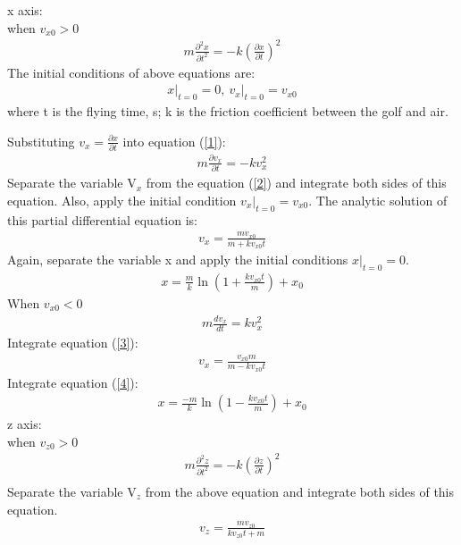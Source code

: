 x axis:\\
when $v_{x 0}>0$
\begin{align}
    m \frac{\partial^{2} x}{\partial t^{2}}=-k\left(\frac{\partial x}{\partial t}\right)^{2}
    \label{1}
\end{align}
The initial conditions of above equations are:
\begin{align}
    \left.x\right|_{t=0}=0,\ \left.v_{x}\right|_{t=0}=v_{x 0}
\end{align}
where t is the flying time, s; k is the friction coefficient between the golf and air.

Substituting $v_{x}=\frac{\partial x}{\partial t}$ into equation (\ref{1}):
\begin{align}
    m \frac{\partial v_{x}}{\partial t}=-k v_{x}^{2}
\label{2}
\end{align}
Separate the variable V$_x$ from the equation (\ref{2}) and integrate both sides of this equation. Also, apply the initial condition $\left.v_{x}\right|_{t=0}=v_{x 0}$. The analytic solution of this partial differential equation is:
\begin{align}
    v_{x}=\frac{m v_{x 0}}{m+k v_{x 0} t}
\end{align}
Again, separate the variable x and apply the initial conditions $\left.x\right|_{t=0}=0$.
\begin{align}
    x=\frac{m}{k} \ln \left(1+\frac{k v_{x 0} t}{m}\right)+x_{0}
\end{align}
When $v_{x 0}<0$
\begin{align}
    m \frac{d v_{x}}{d t}=k v_{x}^{2}
    \label{3}
\end{align}
Integrate equation (\ref{3}):
\begin{align}
    v_{x}=\frac{v_{x 0} m}{m-k v_{x 0} t}
    \label{4}
\end{align}
Integrate equation (\ref{4}):
\begin{align}
x=\frac{-m}{k} \ln \left(1-\frac{k v_{x 0} t}{m}\right)+x_{0}
\end{align}
z axis:\\
when $v_{z 0}>0$
\begin{align}
    m \frac{\partial^{2} z}{\partial t^{2}}=-k\left(\frac{\partial z}{\partial t}\right)^{2}\\
\end{align}
Separate the variable V$_z$ from the above equation and integrate both sides of this equation.
\begin{align}
    v_{z}=\frac{m v_{z 0}}{k v_{z 0} t+m}    
\end{align}
